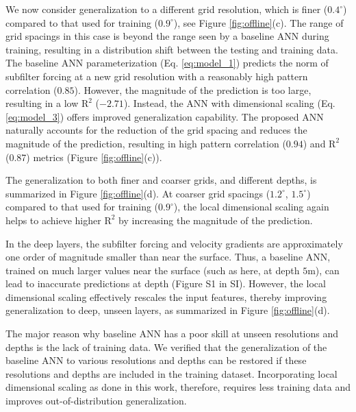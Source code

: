 \documentclass[draft]{agujournal2019}
\begin{document}
We now consider generalization to a different grid resolution, which is finer ($0.4^\circ$) compared to that used for training ($0.9^\circ$), see Figure \ref{fig:offline}(c). The range of grid spacings in this case is beyond the range seen by a baseline ANN during training, resulting in a distribution shift between the testing and training data.  The baseline ANN parameterization (Eq. \eqref{eq:model_1}) predicts the norm of subfilter forcing at a new grid resolution with a reasonably high pattern correlation ($0.85$). However, the magnitude of the prediction is too large, resulting in a low  $\mathrm{R}^2$ ($-2.71$). 
Instead, the ANN with dimensional scaling (Eq. \eqref{eq:model_3}) offers improved generalization capability. The proposed ANN naturally accounts for the reduction of the grid spacing and reduces the magnitude of the prediction, resulting in high pattern correlation ($0.94$) and $\mathrm{R}^2$ (0.87) metrics (Figure \ref{fig:offline}(c)). 

The generalization to both finer and coarser grids, and different depths, is summarized in Figure \ref{fig:offline}(d). At coarser grid spacings ($1.2^\circ$, $1.5^\circ$) compared to that used for training ($0.9^\circ$), the local dimensional scaling again helps to achieve higher $\mathrm{R}^2$ by increasing the magnitude of the prediction. 

In the deep layers, the subfilter forcing and velocity gradients are approximately one order of magnitude smaller than near the surface. Thus, a baseline ANN, trained on much larger values near the surface (such as here, at depth $5$m), can lead to inaccurate predictions at depth (Figure S1 in SI). However, the local dimensional scaling effectively rescales the input features, thereby improving generalization to deep, unseen layers, as summarized in Figure \ref{fig:offline}(d). 

The major reason why baseline ANN has a poor skill at unseen resolutions and depths is the lack of training data. We verified that the generalization of the baseline ANN to various resolutions and depths can be restored if these resolutions and depths are included in the training dataset. Incorporating local dimensional scaling as done in this work, therefore, requires less training data and improves out-of-distribution generalization.
\end{document}
